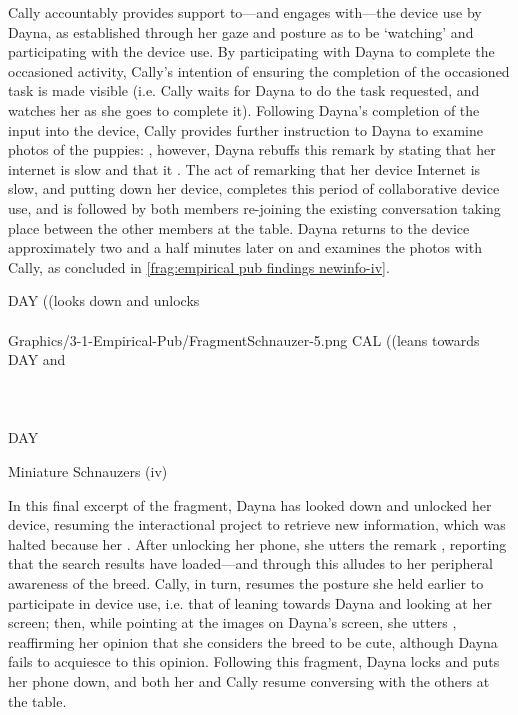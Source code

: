 \begin{revisedsubmission}
Cally accountably provides support to---and engages with---the device use by Dayna, as established through her gaze and posture as to be `watching' and participating with the device use.
By participating with Dayna to complete the occasioned activity, Cally’s intention of ensuring the completion of the occasioned task is made visible (i.e. Cally waits for Dayna to do the task requested, and watches her as she goes to complete it).
Following Dayna's completion of the input into the device, Cally provides further instruction to Dayna to examine photos of the puppies: , however, Dayna rebuffs this remark by stating that her internet is slow and that it .
The act of remarking that her device Internet is slow, and putting down her device, completes this period of collaborative device use, and is followed by both members re-joining the existing conversation taking place between the other members at the table.
Dayna returns to the device approximately two and a half minutes later on and examines the photos with Cally, as concluded in \autoref{frag:empirical pub findings newinfo-iv}. %

\newpage
\begin{fragfloat*}
    {
    \begin{transcript*}[28]
        \by DAY {((looks down and unlocks} \\
         \\
           {Graphics/3-1-Empirical-Pub/FragmentSchnauzer-5.png} 
        \by CAL {((leans towards DAY and} \\
         \\
         \\
         \\
        \by DAY {\vspace*{1.9cm}}
    \end{transcript*}
    \caption{Miniature Schnauzers (iv)}\label{frag:empirical pub findings newinfo-iv}
    }
\end{fragfloat*}

In this final excerpt of the fragment, Dayna has looked down and unlocked her device, resuming the interactional project to retrieve new information, which was halted because her .
After unlocking her phone, she utters the remark , reporting that the search results have loaded---and through this alludes to her peripheral awareness of the breed.
Cally, in turn, resumes the posture she held earlier to participate in device use, i.e. that of leaning towards Dayna and looking at her screen; then, while pointing at the images on Dayna's screen, she utters , reaffirming her opinion that she considers the breed to be cute, although Dayna fails to acquiesce to this opinion.
Following this fragment, Dayna locks and puts her phone down, and both her and Cally resume conversing with the others at the table.


\end{revisedsubmission}
